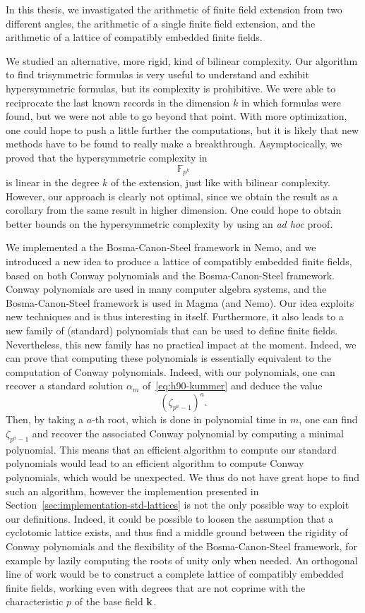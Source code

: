In this thesis, we invastigated the arithmetic of finite field extension from
two different angles, the arithmetic of a single finite field extension, and the
arithmetic of a lattice of compatibly embedded finite fields.

We studied an alternative, more rigid,
kind of bilinear complexity. Our algorithm to find trisymmetric formulas is
very useful to understand and exhibit hypersymmetric formulas, but its
complexity is prohibitive. We were able to reciprocate the last known records in
the dimension $k$ in which formulas were found, but we were not able to go
beyond that point. With more optimization, one could hope to push a
little further the computations, but it is likely that new methods have to be
found to really make a breakthrough. Asymptocically, we proved that the
hypersymmetric complexity in
\[
  \mathbb{F}_{p^{k}}
\]
is linear in the degree $k$ of the extension, just like with bilinear
complexity. However, our approach is clearly not optimal, since we obtain the
result as a corollary from the same result in higher dimension. One could hope
to obtain better bounds on the hypersymmetric complexity by using an
\emph{ad hoc} proof.

We implemented a the Bosma-Canon-Steel framework in Nemo, and we introduced a
new idea to produce a lattice of
compatibly embedded finite fields, based on both Conway polynomials and the
Bosma-Canon-Steel framework. Conway polynomials are used in many computer
algebra systems, and the Bosma-Canon-Steel framework is used in Magma (and Nemo).
Our idea exploits new techniques and is thus
interesting in itself. Furthermore, it also leads to a new family of (standard)
polynomials that can be used to define finite fields. Nevertheless, this new
family has no practical impact at the moment. Indeed, we can prove that
computing these polynomials is essentially equivalent to the computation of
Conway polynomials. Indeed, with our polynomials, one can recover a standard
solution $\alpha_m$ of~\eqref{eq:h90-kummer} and deduce the value
\[
  (\zeta_{p^a-1})^a.
\]
Then, by taking a $a$-th root, which is done in polynomial time in $m$, one can
find $\zeta_{p^a-1}$ and recover the associated Conway polynomial by computing a
minimal polynomial. This means that an efficient algorithm to compute our
standard polynomials would lead to an efficient algorithm to compute Conway
polynomials, which would be unexpected. We thus do not have great hope to find
such an algorithm, however the implemention presented in
Section~\ref{sec:implementation-std-lattices} is not the only possible way to
exploit our definitions. Indeed, it could be possible to loosen the assumption
that a cyclotomic lattice exists, and thus find a middle ground between the
rigidity of Conway polynomials and the flexibility of the Bosma-Canon-Steel
framework, for example by lazily computing the roots of unity only when needed.
An orthogonal line of work would be to construct a complete lattice of
compatibly embedded finite fields, \ie working even with degrees that are not
coprime with the characteristic $p$ of the base field $\mathbf{k}$.
